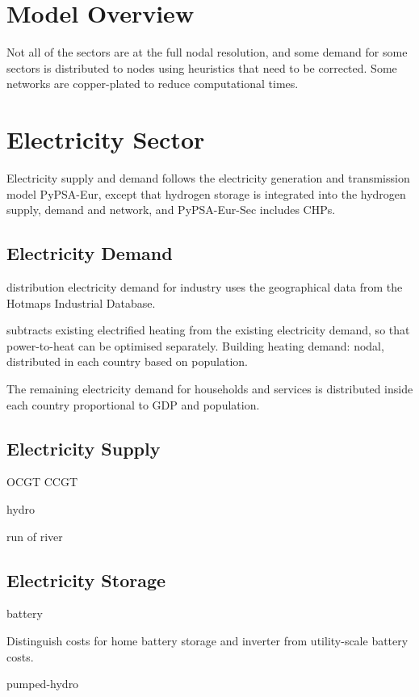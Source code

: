 \section{Model Overview}

Not all of the sectors are at the full nodal resolution, and some demand for
some sectors is distributed to nodes using heuristics that need to be corrected.
Some networks are copper-plated to reduce computational times.

\section{Electricity Sector}

Electricity supply and demand follows the electricity generation and
transmission model PyPSA-Eur, except that hydrogen storage is integrated into
the hydrogen supply, demand and network, and PyPSA-Eur-Sec includes CHPs.


\subsection{Electricity Demand}

distribution electricity demand for
industry uses the geographical data from
the Hotmaps Industrial Database.

subtracts existing electrified heating from
the existing electricity demand, so that power-to-heat can be optimised
separately.
Building heating demand: nodal, distributed in each country based on population.

The remaining electricity demand for households and services is distributed
inside each country proportional to GDP and population.

\subsection{Electricity Supply}

OCGT CCGT

hydro

run of river

\subsection{Electricity Storage}

battery

Distinguish costs for home battery storage and inverter from utility-scale battery costs.

pumped-hydro

